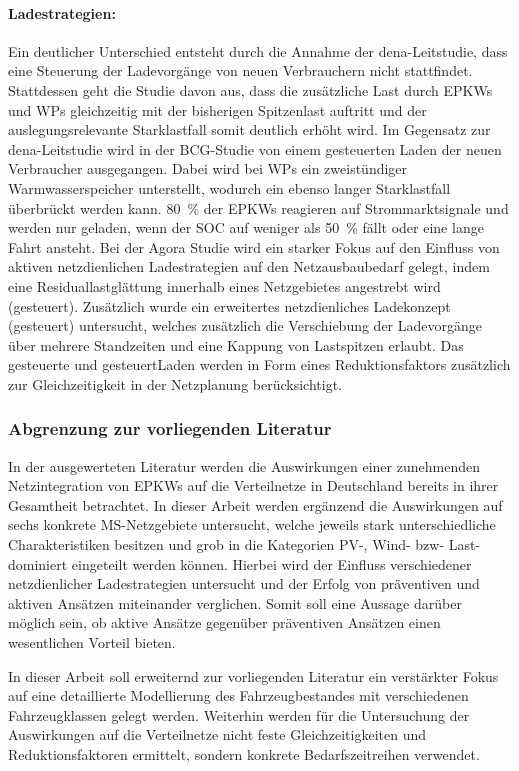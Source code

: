 \paragraph{Ladestrategien:}

Ein deutlicher Unterschied entsteht durch die Annahme der dena-Leitstudie, dass eine Steuerung der Ladevorgänge von neuen Verbrauchern nicht stattfindet.
Stattdessen geht die Studie davon aus, dass die zusätzliche Last durch \glspl{EPKW} und \glspl{WP} gleichzeitig mit der bisherigen Spitzenlast auftritt und der auslegungsrelevante Starklastfall somit deutlich erhöht wird.
Im Gegensatz zur dena-Leitstudie wird in der BCG-Studie von einem gesteuerten Laden der neuen Verbraucher ausgegangen.
Dabei wird bei \glspl{WP} ein zweistündiger Warmwasserspeicher unterstellt, wodurch ein ebenso langer Starklastfall überbrückt werden kann.
\SI{80}{\percent} der \glspl{EPKW} reagieren auf Strommarktsignale und werden nur geladen, wenn der \gls{SOC} auf weniger als \SI{50}{\percent} fällt oder eine lange Fahrt ansteht.
Bei der Agora Studie wird ein starker Fokus auf den Einfluss von aktiven netzdienlichen Ladestrategien auf den Netzausbaubedarf gelegt, indem eine Residuallastglättung innerhalb eines Netzgebietes angestrebt wird (gesteuert).
Zusätzlich wurde ein erweitertes netzdienliches Ladekonzept (gesteuert\Plus) untersucht, welches zusätzlich die Verschiebung der Ladevorgänge über mehrere Standzeiten und eine Kappung von Lastspitzen erlaubt.
Das gesteuerte und gesteuert\Plus Laden werden in Form eines Reduktionsfaktors zusätzlich zur Gleichzeitigkeit in der Netzplanung berücksichtigt.


\subsubsection{Abgrenzung zur vorliegenden Literatur}

In der ausgewerteten Literatur werden die Auswirkungen einer zunehmenden Netzintegration von \glspl{EPKW} auf die Verteilnetze in Deutschland bereits in ihrer Gesamtheit betrachtet.
In dieser Arbeit werden ergänzend die Auswirkungen auf sechs konkrete \gls{MS}-Netzgebiete untersucht, welche jeweils stark unterschiedliche Charakteristiken besitzen und grob in die Kategorien \gls{PV}-, Wind- bzw- Last-dominiert eingeteilt werden können.
Hierbei wird der Einfluss verschiedener netzdienlicher Ladestrategien untersucht und der Erfolg von präventiven und aktiven Ansätzen miteinander verglichen.
Somit soll eine Aussage darüber möglich sein, ob aktive Ansätze gegenüber präventiven Ansätzen einen wesentlichen Vorteil bieten.\medskip

In dieser Arbeit soll erweiternd zur vorliegenden Literatur ein verstärkter Fokus auf eine detaillierte Modellierung des Fahrzeugbestandes mit verschiedenen Fahrzeugklassen gelegt werden.
Weiterhin werden für die Untersuchung der Auswirkungen auf die Verteilnetze nicht feste Gleichzeitigkeiten und Reduktionsfaktoren ermittelt, sondern konkrete Bedarfszeitreihen verwendet.


\clearpage
